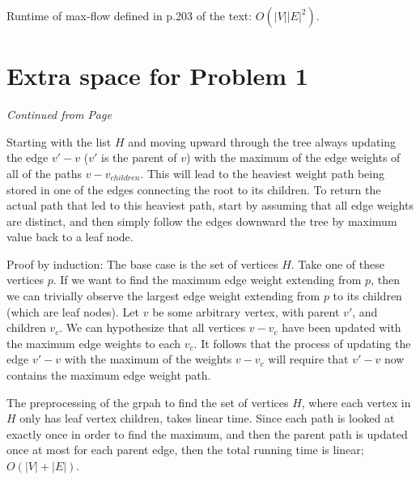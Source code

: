 \documentclass[11pt]{article}
\begin{document}
Runtime of max-flow defined in p.203 of the text: $O(|V||E|^2)$.

\label{pg:end-of-p6}

%

\newpage


 
 \section*{Extra space for Problem 1}
 \emph{Continued from Page \pageref{pg:end-of-p1}}
 

 \label{pg:p1-continuation}

Starting with the list $H$ and moving upward through the tree always updating 
the edge  $v'-v$ ($v'$ is the parent of $v$) with the maximum of the edge weights
of all of the paths $v-v_{children}$. This will lead to the heaviest weight path
being stored in one of the edges connecting the root to its children. To return the
actual path that led to this heaviest path, start by assuming that all edge weights are
distinct, and then simply follow the edges downward the tree by maximum value back to a leaf
node. 

Proof by induction: The base case is the set of vertices $H$. Take one of these
vertices $p$. If we want to find the maximum edge weight extending from $p$, then
we can trivially observe the largest edge weight extending from $p$ to its children
(which are leaf nodes). 
Let $v$ be some arbitrary vertex, with parent $v'$, and children $v_c$.
We can hypothesize that all vertices $v-v_c$ have been updated with the maximum
edge weights to each $v_c$. 
It follows that the process of updating the edge $v'-v$ with the maximum of the
weights $v-v_c$ will require that $v'-v$ now contains the maximum edge weight path.

The preprocessing of the grpah to find the set of vertices $H$, where each vertex in
$H$ only has leaf vertex children, takes linear time.
Since each path is looked at exactly once in order to find the maximum, and then
the parent path is updated once at most for each parent edge, then the total running
time is linear; $O(|V|+|E|)$.
 
\end{document}
